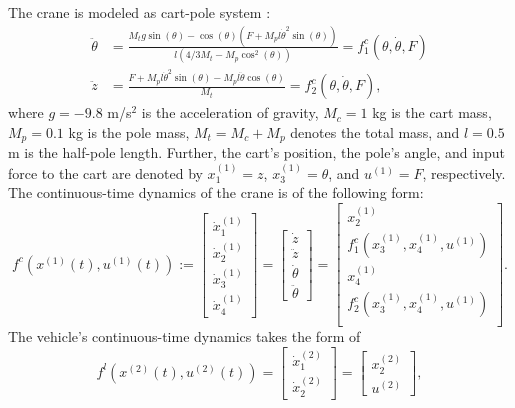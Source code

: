 The crane is modeled as cart-pole system \cite{Barto1983}:
\begin{align*}
	\ddot{\theta} &= \frac{M_tg\sin(\theta) - \cos(\theta)(F + M_pl \dot{\theta}^2 \sin(\theta))}{l(4/3 M_t- M_p \cos^2(\theta))}=f^c_1(\theta,\dot{\theta},F)\\
	\ddot{z}&= \frac{F + M_pl \dot{\theta}^2 \sin(\theta)-M_pl \ddot{\theta} \cos(\theta)}{M_t}=f^c_2(\theta,\dot{\theta},F),
\end{align*}
where
	$g=-9.8$ m/s$^2$ is the acceleration of gravity,
	$M_c=1$ kg is the cart mass,
	$M_p=0.1$ kg is the pole mass,
	$M_t=M_c+M_p$ denotes the total mass,
and
	$l=0.5$ m is the half-pole length.
Further, the cart's position, the pole's angle, and input force to the cart are denoted by $x_1^{(1)}=z$, $x_3^{(1)}=\theta$, 
and $u^{(1)}=F$, respectively. 
The continuous-time dynamics of the crane is of the following form:
\[f^{c}(x^{(1)}(t),u^{(1)}(t)):=\begin{bmatrix}
	\dot{x}_1^{(1)}\\
	\dot{x}_2^{(1)}\\
	\dot{x}_3^{(1)}\\
	\dot{x}_4^{(1)}
\end{bmatrix}=\begin{bmatrix}
\dot{z}\\
\ddot{z}\\
\dot{\theta}\\
\ddot{\theta}
\end{bmatrix}=
\begin{bmatrix}
	x_2^{(1)}\\
	f^c_1(x_3^{(1)},x_4^{(1)},u^{(1)})\\
	x_4^{(1)}\\
	f^c_2(x_3^{(1)},x_4^{(1)},u^{(1)})\\
\end{bmatrix}.\]
The vehicle's continuous-time dynamics takes the form of
\[f^{l}(x^{(2)}(t),u^{(2)}(t))=\begin{bmatrix}
\dot{x}_1^{(2)}\\ \dot{x}^{(2)}_2 \end{bmatrix}=\begin{bmatrix} x^{(2)}_2\\ u^{(2)} \end{bmatrix},
\]
